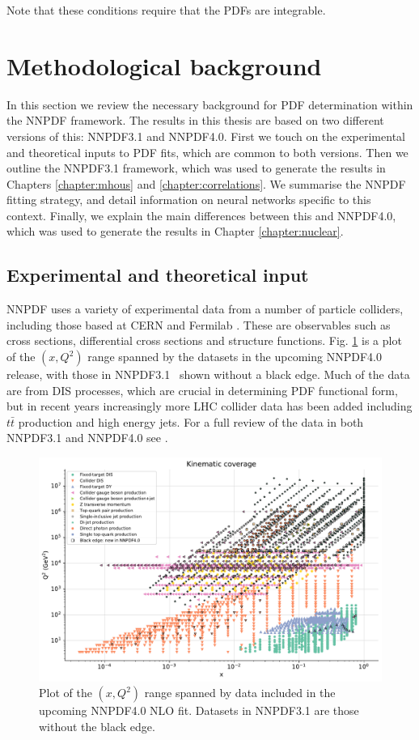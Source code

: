Note that these conditions require that the PDFs are integrable. 


\section{Methodological background}

In this section we review the necessary background for PDF determination within the NNPDF \cite{nnpdf} framework. The results in this thesis are based on two different versions of this: NNPDF3.1 and NNPDF4.0. First we touch on the experimental and theoretical inputs to PDF fits, which are common to both versions. Then we outline the NNPDF3.1 framework, which was used to generate the results in Chapters \ref{chapter:mhous} and \ref{chapter:correlations}. We summarise the NNPDF fitting strategy, and detail information on neural networks specific to this context. Finally, we explain the main differences between this and NNPDF4.0, which was used to generate the results in Chapter \ref{chapter:nuclear}.

\subsection{Experimental and theoretical input}

NNPDF uses a variety of experimental data from a number of particle colliders, including those based at CERN \cite{cern} and Fermilab \cite{fermilab}. These are observables such as cross sections, differential cross sections and structure functions. Fig. \ref{data} is a plot of the $(x,Q^2)$ range spanned by the datasets in the upcoming NNPDF4.0 release, with those in NNPDF3.1~\cite{Ball:2017nwa} shown without a black edge. Much of the data are from DIS processes, which are crucial in determining PDF functional form, but in recent years increasingly more LHC collider data has been added including $t\bar{t}$ production and high energy jets. For a full review of the data in both NNPDF3.1 and NNPDF4.0 see \cite{EmanueleTalk}.

\begin{figure}
\centering
\includegraphics[width=15cm]{background/kinplot.pdf}
\caption{Plot of the $(x,Q^2)$ range spanned by data included in the upcoming NNPDF4.0 NLO fit. Datasets in NNPDF3.1 are those without the black edge.}
\label{data}
\end{figure}

